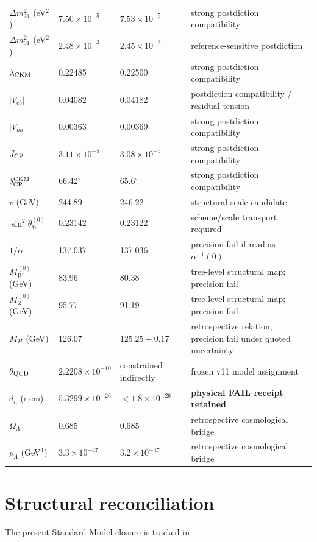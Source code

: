 \begin{longtable}{p{}p{}p{}p{}}
$\Delta m_{21}^2$ (eV$^2$) & $7.50\times10^{-5}$ & $7.53\times10^{-5}$ & strong postdiction compatibility\\
$\Delta m_{31}^2$ (eV$^2$) & $2.48\times10^{-3}$ & $2.45\times10^{-3}$ & reference-sensitive postdiction\\
\midrule
$\lambda_{\rm CKM}$ & 0.22485 & 0.22500 & strong postdiction compatibility\\
$|V_{cb}|$ & 0.04082 & 0.04182 & postdiction compatibility / residual tension\\
$|V_{ub}|$ & 0.00363 & 0.00369 & strong postdiction compatibility\\
$J_{\rm CP}$ & $3.11\times10^{-5}$ & $3.08\times10^{-5}$ & strong postdiction compatibility\\
$\delta_{\rm CP}^{\rm CKM}$ & $66.42^\circ$ & $65.6^\circ$ & strong postdiction compatibility\\
\midrule
$v$ (GeV) & 244.89 & 246.22 & structural scale candidate\\
$\sin^2\theta_W^{(0)}$ & 0.23142 & 0.23122 & scheme/scale transport required\\
$1/\alpha$ & 137.037 & 137.036 & precision fail if read as $\alpha^{-1}(0)$\\
$M_W^{(0)}$ (GeV) & 83.96 & 80.38 & tree-level structural map; precision fail\\
$M_Z^{(0)}$ (GeV) & 95.77 & 91.19 & tree-level structural map; precision fail\\
$M_H$ (GeV) & 126.07 & $125.25\pm0.17$ & retrospective relation; precision fail under quoted uncertainty\\
\midrule
$\theta_{\rm QCD}$ & $2.2208\times10^{-10}$ & constrained indirectly & frozen v11 model assignment\\
$d_n$ ($e\,\mathrm{cm}$) & $5.3299\times10^{-26}$ & $<1.8\times10^{-26}$ & \textbf{physical FAIL receipt retained}\\
\midrule
$\Omega_\Lambda$ & 0.685 & 0.685 & retrospective cosmological bridge\\
$\rho_\Lambda$ (GeV$^4$) & $3.3\times10^{-47}$ & $3.2\times10^{-47}$ & retrospective cosmological bridge\\
\bottomrule
\end{longtable}

\section{Structural reconciliation}
The present Standard-Model closure is tracked in

